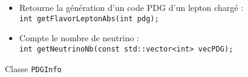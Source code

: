 \begin{figure}[h!]
\begin{description}
\begin{itemize}
			\item Retourne la génération d'un code PDG d'un lepton chargé :\\
\verb|int getFlavorLeptonAbs(int pdg);|

			\item Compte le nombre de neutrino :\\
\verb|int getNeutrinoNb(const std::vector<int> vecPDG);|

	\end{itemize}
	\end{description}
	
	\caption{Classe \texttt{PDGInfo}}
	\label{tab:PDGInfo}
\end{figure}
